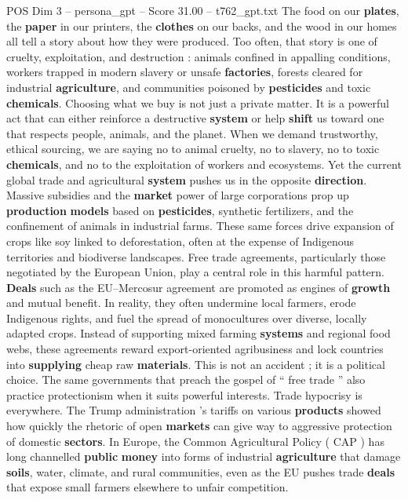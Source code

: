 \begin{textsample}{POS Dim 3 – persona\_gpt – Score 31.00 – t762\_gpt.txt}  \label{ex:f3_pos_029}
The food on our \textbf{plates}, the \textbf{paper} in our printers, the \textbf{clothes} on our backs, and the wood in our homes all tell a story about how they were produced.
Too often, that story is one of cruelty, exploitation, and destruction : animals confined in appalling conditions, workers trapped in modern slavery or unsafe \textbf{factories}, forests cleared for industrial \textbf{agriculture}, and communities poisoned by \textbf{pesticides} and toxic \textbf{chemicals}.
Choosing what we buy is not just a private matter.
It is a powerful act that can either reinforce a destructive \textbf{system} or help \textbf{shift} us toward one that respects people, animals, and the planet.
When we demand trustworthy, ethical sourcing, we are saying no to animal cruelty, no to slavery, no to toxic \textbf{chemicals}, and no to the exploitation of workers and ecosystems.
Yet the current global trade and agricultural \textbf{system} pushes us in the opposite \textbf{direction}.
Massive subsidies and the \textbf{market} power of large corporations prop up \textbf{production} \textbf{models} based on \textbf{pesticides}, synthetic fertilizers, and the confinement of animals in industrial farms.
These same forces drive expansion of crops like soy linked to deforestation, often at the expense of Indigenous territories and biodiverse landscapes.
Free trade agreements, particularly those negotiated by the European Union, play a central role in this harmful pattern. \textbf{Deals} such as the EU–Mercosur agreement are promoted as engines of \textbf{growth} and mutual benefit.
In reality, they often undermine local farmers, erode Indigenous rights, and fuel the spread of monocultures over diverse, locally adapted crops.
Instead of supporting mixed farming \textbf{systems} and regional food webs, these agreements reward export-oriented agribusiness and lock countries into \textbf{supplying} cheap raw \textbf{materials}.
This is not an accident ; it is a political choice.
The same governments that preach the gospel of “ free trade ” also practice protectionism when it suits powerful interests.
Trade hypocrisy is everywhere.
The Trump administration ’s tariffs on various \textbf{products} showed how quickly the rhetoric of open \textbf{markets} can give way to aggressive protection of domestic \textbf{sectors}.
In Europe, the Common Agricultural Policy ( CAP ) has long channelled \textbf{public} \textbf{money} into forms of industrial \textbf{agriculture} that damage \textbf{soils}, water, climate, and rural communities, even as the EU pushes trade \textbf{deals} that expose small farmers elsewhere to unfair competition.

\end{textsample}
